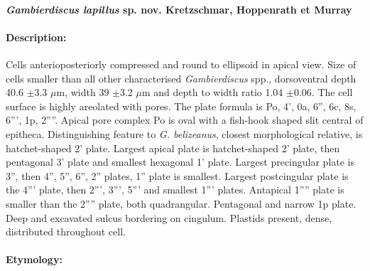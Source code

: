 \documentclass[12pt]{article}
\begin{document}

 \paragraph{\textbf{\emph{Gambierdiscus lapillus} sp. nov. Kretzschmar, Hoppenrath et Murray}}
 \paragraph{Description:} Cells anterioposteriorly compressed and round to ellipsoid in apical view. 
 Size of cells smaller than all other characterised \emph{Gambierdiscus} spp., dorsoventral depth 40.6 $\pm$3.3 $\mu$m, width 39 $\pm$3.2 $\mu$m and depth to width ratio 1.04 $\pm$0.06. 
 The cell surface is highly areolated with pores. 
 The plate formula is Po, 4', 0a, 6'', 6c, 8s, 6''', 1p, 2''''. 
Apical pore complex Po is oval with a fish-hook shaped slit central of epitheca. Distinguishing feature to \emph{G. belizeanus}, closest morphological relative, is hatchet-shaped 2' plate. Largest apical plate is hatchet-shaped 2' plate, then pentagonal 3' plate and smallest hexagonal 1' plate. Largest precingular plate is 3'', then 4'', 5'', 6'', 2'' plates, 1'' plate is smallest. 
Largest postcingular plate is the 4''' plate, then 2''', 3''', 5''' and smallest 1''' plates. Antapical 1'''' plate is smaller than the 2'''' plate, both quadrangular. Pentagonal and narrow 1p plate. 
Deep and excavated sulcus bordering on cingulum. Plastids present, dense, distributed throughout cell. 
 \paragraph{Etymology:} %
\end{document}
